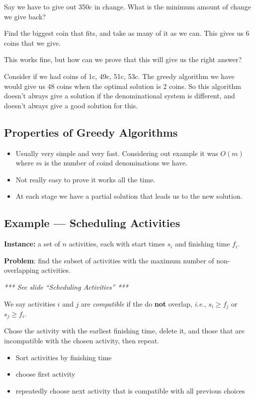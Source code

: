 \documentclass[12pt]{article}
\begin{document}
Say we have to give out 350c in change. What is the minimum amount of change we
give back?

Find the biggest coin that fits, and take as many of it as we can. This gives us
6 coins that we give.

This works fine, but how can we prove that this will give us the right answer?

Consider if we had coins of 1c, 49c, 51c, 53c. The greedy algorithm we have
would give us 48 coins when the optimal solution is 2 coins. So this algorithm
doesn't always give a solution if the denominational system is different, and
doesn't always give a good solution for this.

\subsection{Properties of Greedy Algorithms}

\begin{itemize}
	\item Usually very simple and very fast. Considering out example it was
		$O(m)$ where $m$ is the number of coind denominations we have.
	\item Not really easy to prove it works all the time.
	\item At each stage we have a partial solution that leads us to the new
		solution.
\end{itemize}

\subsection{Example --- Scheduling Activities}

\textbf{Instance:} a set of $n$ activities, each with start times $s_i$ and
finishing time $f_i$.

\textbf{Problem}: find the subset of activities with the maximum number of
non-overlapping activities.

\begin{center}
\emph{*** See slide ``Scheduling Activities'' ***}
\end{center}

We say activities $i$ and $j$ are \emph{compatible} if the do \textbf{not}
overlap, \textit{i.e.}, $s_i \ge f_j$ or $s_j \ge f_i$.

Chose the activity with the earliest finishing time, delete it, and those that
are incompatible with the chosen activity, then repeat.

\begin{itemize}
	\item Sort activities by finishing time
	\item choose first activity
	\item repeatedly choose next activity that is compatible with all previous
		choices
\end{itemize}
\end{document}
